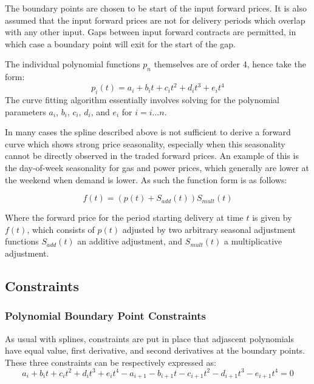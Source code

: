 \documentclass{article}
\begin{document}
\bigskip

The boundary points are chosen to be start of the input forward prices. It is also
assumed that the input forward prices are not for delivery periods which overlap
with any other input. Gaps between input forward contracts are permitted, in which
case a boundary point will exit for the start of the gap.

\bigskip

The individual polynomial functions $p_n$ themselves are of order 4, hence take the form:
\begin{equation}
p_i(t) = a_i + b_i t + c_i t^2 + d_i t^3 + e_i t^4
\end{equation}
The curve fitting algorithm essentially involves solving for the polynomial parameters
$a_i$, $b_i$, $c_i$, $d_i$, and $e_i$ for $i=i \hdots n$.

\bigskip
In many cases the spline described above is not sufficient to derive a forward curve which
shows strong price seasonality, especially when this seasonality cannot be directly observed
in the traded forward prices. An example of this is the day-of-week seasonality for gas and
power prices, which generally are lower at the weekend when demand is lower. As such the 
function form is as follows:

\begin{equation}
    \label{eq:foward_function}
    f(t) = (p(t) + S_{add}(t))S_{mult}(t)
\end{equation}

Where the forward price for the period starting delivery at time $t$ is given by $f(t)$, which 
consists of $p(t)$ adjusted by two arbitrary seasonal adjustment functions
$S_{add}(t)$ an additive adjustment, and $S_{mult}(t)$ a multiplicative adjustment.


\subsection{Constraints}
\subsubsection{Polynomial Boundary Point Constraints}
As usual with splines, constraints are put in place that adjascent polynomials have equal value, first derivative, and second derivatives at the boundary points.
These three constraints can be respectively expressed as:
\begin{equation}
    \label{eq:continuity_constraint}
    a_i + b_i t + c_i t^2 + d_i t^3 + e_i t^4 - 
    a_{i+1} - b_{i+1} t - c_{i+1} t^2 - d_{i+1} t^3 - e_{i+1} t^4 = 0
\end{equation}
\end{document}
